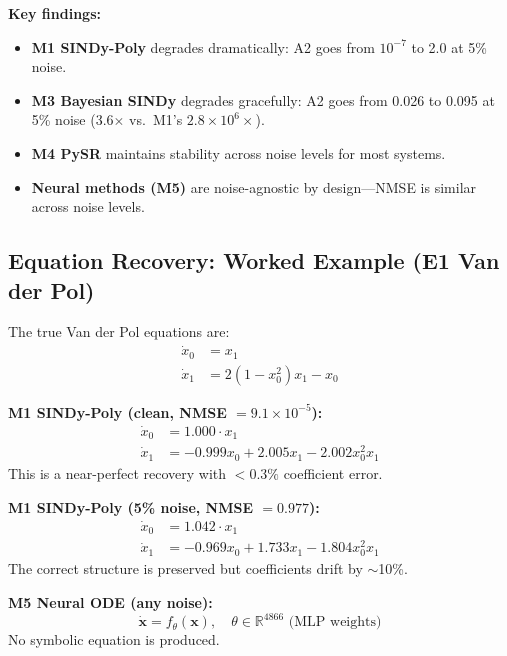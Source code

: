 \textbf{Key findings:}
\begin{itemize}
    \item \textbf{M1 SINDy-Poly} degrades dramatically: A2 goes from $10^{-7}$ to 2.0 at 5\% noise.
    \item \textbf{M3 Bayesian SINDy} degrades gracefully: A2 goes from 0.026 to 0.095 at 5\% noise (3.6$\times$ vs.\ M1's $2.8\times10^6\times$).
    \item \textbf{M4 PySR} maintains stability across noise levels for most systems.
    \item \textbf{Neural methods (M5)} are noise-agnostic by design---NMSE is similar across noise levels.
\end{itemize}

\subsection{Equation Recovery: Worked Example (E1 Van der Pol)}

The true Van der Pol equations are:
\begin{align}
\dot{x}_0 &= x_1 \\
\dot{x}_1 &= 2(1 - x_0^2) x_1 - x_0
\end{align}

\textbf{M1 SINDy-Poly (clean, NMSE $= 9.1 \times 10^{-5}$):}
\begin{align}
\dot{x}_0 &= 1.000 \cdot x_1 \\
\dot{x}_1 &= -0.999 x_0 + 2.005 x_1 - 2.002 x_0^2 x_1
\end{align}
This is a near-perfect recovery with $<0.3\%$ coefficient error.

\textbf{M1 SINDy-Poly (5\% noise, NMSE $= 0.977$):}
\begin{align}
\dot{x}_0 &= 1.042 \cdot x_1 \\
\dot{x}_1 &= -0.969 x_0 + 1.733 x_1 - 1.804 x_0^2 x_1
\end{align}
The correct structure is preserved but coefficients drift by $\sim$10\%.

\textbf{M5 Neural ODE (any noise):}
\begin{equation}
\dot{\mathbf{x}} = f_\theta(\mathbf{x}), \quad \theta \in \mathbb{R}^{4866} \text{ (MLP weights)}
\end{equation}
No symbolic equation is produced.
